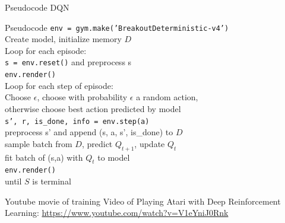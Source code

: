 \documentclass{beamer}
\begin{document}
\begin{frame}{Pseudocode DQN}
\begin{exampleblock}{Pseudocode}
\texttt{env = gym.make('BreakoutDeterministic-v4')}\\
Create model, initialize memory $D$\\
Loop for each episode:\\
\hspace*{0.5cm} \texttt{s = env.reset()} and preprocess s\\
\hspace*{0.5cm} \texttt{env.render()}\\
\hspace*{0.5cm} Loop for each step of episode:\\
\hspace*{0.5cm} \hspace*{0.5cm} Choose $\epsilon$, choose with probability $\epsilon$ a random action,\\
\hspace*{0.5cm} \hspace*{0.5cm} otherwise choose best action predicted by model\\
\hspace*{0.5cm} \hspace*{0.5cm} \texttt{s', r, is\_done, info = env.step(a)}\\
\hspace*{0.5cm} \hspace*{0.5cm} preprocess s' and append (s, a, s', is\_done) to $D$\\
\hspace*{0.5cm} \hspace*{0.5cm} sample batch from $D$, predict $Q_{t+1}$, update $Q_t$\\
\hspace*{0.5cm} \hspace*{0.5cm} fit batch of (s,a) with $Q_t$ to model\\
\hspace*{0.5cm}\hspace*{0.5cm} \texttt{env.render()}\\
\hspace*{0.5cm} until $S$ is terminal
\end{exampleblock}
\end{frame}

\begin{frame}{Youtube movie of training}
\centering
Video of Playing Atari with Deep Reinforcement Learning:
\url{https://www.youtube.com/watch?v=V1eYniJ0Rnk}
\end{frame}
\end{document}
